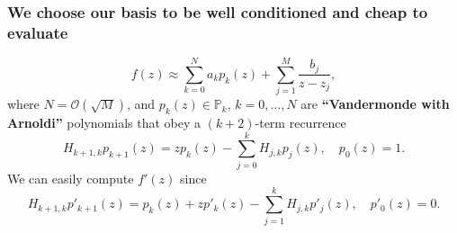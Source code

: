 \begin{frame}
\frametitle{We choose our basis to be well conditioned and cheap to evaluate}

\begin{equation*}
f(z) \approx \sum_{k=0}^{N} a_k p_k (z) + \sum_{j=1}^{M} \frac{b_j}{z-z_j},
\end{equation*}
where $N=\mathcal{O}(\sqrt{M})$, and $p_k(z)\in \mathbb{P}_k$, $k=0,\ldots,N$ are \textbf{``Vandermonde with Arnoldi''} polynomials that obey a $(k+2)$-term recurrence
\begin{equation*}
H_{k+1,k} p_{k+1}(z) = z p_{k}(z) - \sum_{j=0}^{k} H_{j,k} p_j(z), \quad p_0(z)=1.
\end{equation*}
We can easily compute $f'(z)$ since
\begin{equation*}
H_{k+1,k} p'_{k+1}(z) = p_{k}(z) +z p'_{k}(z) - \sum_{j=1}^{k} H_{j,k} p'_j(z), \quad p'_0(z)=0.
\end{equation*}
\end{frame}




